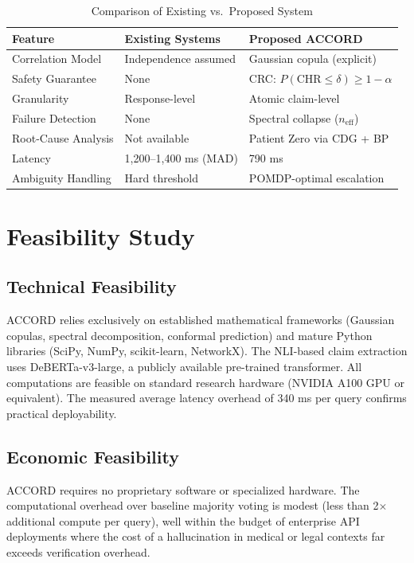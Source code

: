 \documentclass[12pt,a4paper]{report}
\begin{document}
\begin{table}[htbp]
\centering
\caption{Comparison of Existing vs.\ Proposed System}
\label{tab:system_comparison}
\begin{tabular}{p{4cm}p{5cm}p{5cm}}
\toprule
\textbf{Feature} & \textbf{Existing Systems} & \textbf{Proposed ACCORD} \\
\midrule
Correlation Model & Independence assumed & Gaussian copula (explicit) \\
Safety Guarantee & None & CRC: $P(\text{CHR} \leq \delta) \geq 1-\alpha$ \\
Granularity & Response-level & Atomic claim-level \\
Failure Detection & None & Spectral collapse ($n_{\text{eff}}$) \\
Root-Cause Analysis & Not available & Patient Zero via CDG + BP \\
Latency & 1{,}200--1{,}400 ms (MAD) & 790 ms \\
Ambiguity Handling & Hard threshold & POMDP-optimal escalation \\
\bottomrule
\end{tabular}
\end{table}

\section{Feasibility Study}

\subsection{Technical Feasibility}
ACCORD relies exclusively on established mathematical frameworks (Gaussian copulas, spectral decomposition, conformal prediction) and mature Python libraries (SciPy, NumPy, scikit-learn, NetworkX). The NLI-based claim extraction uses DeBERTa-v3-large, a publicly available pre-trained transformer. All computations are feasible on standard research hardware (NVIDIA A100 GPU or equivalent). The measured average latency overhead of 340 ms per query confirms practical deployability.

\subsection{Economic Feasibility}
ACCORD requires no proprietary software or specialized hardware. The computational overhead over baseline majority voting is modest (less than 2$\times$ additional compute per query), well within the budget of enterprise API deployments where the cost of a hallucination in medical or legal contexts far exceeds verification overhead.
\end{document}
